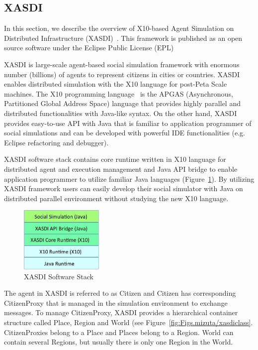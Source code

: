 \subsection{XASDI}
\label{ss:XASDI}

In this section, we describe the overview of X10-based Agent Simulation on Distributed Infrastructure (XASDI)~\cite{xasdi}.
This framework is published as an open source software under the Eclipse Public License (EPL)

XASDI is large-scale agent-based social simulation framework with enormous number (billions) of agents to represent citizens in cities or countries.
XASDI enables distributed simulation with the X10 language for post-Peta Scale machines.
The X10 programming language~\cite{x10} is the APGAS (Asynchronous, Partitioned Global Address Space) language that provides highly parallel and distributed functionalities with Java-like syntax.
On the other hand, XASDI provides easy-to-use API with Java that is familiar to application programmer of social simulations and can be developed with powerful IDE functionalities (e.g. Eclipse refactoring and debugger).

XASDI software stack contains core runtime written in X10 language for distributed agent and execution management and Java API bridge to enable application programmer to utilize familiar Java languages (Figure~\ref{fig:Figs.mizuta/xasdistack}).
By utilizing XASDI framework users can easily develop their social simulator with Java on distributed parallel environment without studying the new X10 language.

\begin{figure}[h]
  \centering
  \includegraphics[width=4cm]{Figs.mizuta/xasdistack.pdf}
  \caption{XASDI Software Stack}
  \label{fig:Figs.mizuta/xasdistack}
\end{figure}


The agent in XASDI is referred to as Citizen and Citizen has corresponding CitizenProxy that is managed in the simulation environment to exchange messages.
To manage CitizenProxy, XASDI provides a hierarchical container structure called Place, Region and World (see Figure~\ref{fig:Figs.mizuta/xasdiclass}. CitizenProxies belong to a Place and Places belong to a Region. World can contain several Regions, but usually there is only one Region in the World.


